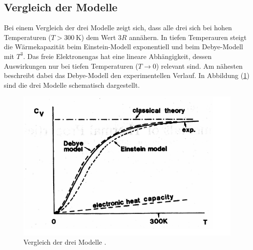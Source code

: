 \subsection{Vergleich der Modelle}
\label{sec:Vergleich der Modelle}
Bei einem Vergleich der drei Modelle zeigt sich, dass alle drei sich bei hohen Temperaturen ($T>\SI{300}{\kelvin}$) dem Wert $3R$ annähern. In tiefen Temperauren steigt die Wärmekapazität beim Einstein-Modell exponentiell und beim Debye-Modell mit $T^3$. Das freie Elektronengas hat eine lineare Abhängigkeit, dessen Auswirkungen nur bei tiefen Temperaturen ($T \rightarrow 0$) relevant sind. Am nähesten beschreibt dabei das Debye-Modell den experimentellen Verlauf. In Abbildung (\ref{fig:tkurve}) sind die drei Modelle schematisch dargestellt.
\begin{figure}
	\centering
	\includegraphics[scale=0.5]{fig/tkurve.png}
	\caption{Vergleich der drei Modelle \cite[12]{Anleitung10}.}
	\label{fig:tkurve}
\end{figure}
\FloatBarrier
